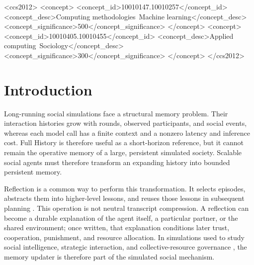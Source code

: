 \documentclass[sigconf,anonymous]{acmart}
\begin{document}
\begin{CCSXML}
<ccs2012>
 <concept>
  <concept_id>10010147.10010257</concept_id>
  <concept_desc>Computing methodologies~Machine learning</concept_desc>
  <concept_significance>500</concept_significance>
 </concept>
 <concept>
  <concept_id>10010405.10010455</concept_id>
  <concept_desc>Applied computing~Sociology</concept_desc>
  <concept_significance>300</concept_significance>
 </concept>
</ccs2012>
\end{CCSXML}



\acmDOI{}
\acmISBN{}

\maketitle

\section{Introduction}

Long-running social simulations face a structural memory problem. Their
interaction histories grow with rounds, observed participants, and social
events, whereas each model call has a finite context and a nonzero latency and
inference cost. Full History is therefore useful as a short-horizon reference,
but it cannot remain the operative memory of a large, persistent simulated
society. Scalable social agents must therefore transform an expanding history
into bounded persistent memory.

Reflection is a common way to perform this transformation. It selects episodes,
abstracts them into higher-level lessons, and reuses those lessons in subsequent
planning \cite{park2023generative,shinn2023reflexion}. This operation is not
neutral transcript compression. A reflection can become a durable explanation
of the agent itself, a particular partner, or the shared environment; once
written, that explanation conditions later trust, cooperation, punishment, and
resource allocation. In simulations used to study social intelligence,
strategic interaction, and collective-resource governance
\cite{zhou2024sotopia,mao2025alympics,piatti2024cooperate}, the memory updater is
therefore part of the simulated social mechanism.
\end{document}
